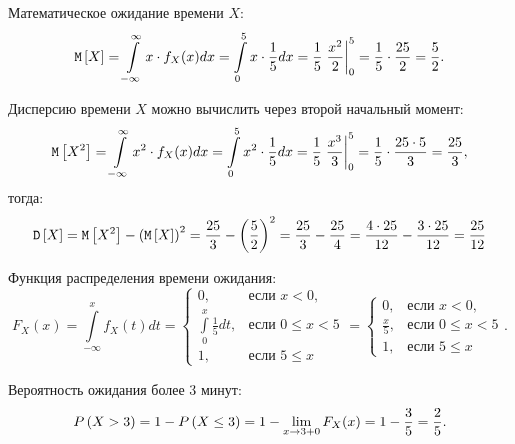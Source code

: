 Математическое ожидание времени $X$:
\begin{equation}
    \mathtt{M} \left [ X \right ]
    = \int \limits_{-\infty}^{\infty} x \cdot f_X(x) dx
    = \int \limits_0^5 x \cdot \frac{1}{5} dx
    = \frac{1}{5} \left . \frac{x^2}{2} \right |_0^5
    = \frac{1}{5} \cdot \frac{25}{2}
    = \frac{5}{2} .
\end{equation}

Дисперсию времени $X$ можно вычислить через второй начальный момент:
\begin{equation}
    \mathtt{M} \left [ X^2 \right ]
    = \int \limits_{-\infty}^{\infty} x^2 \cdot f_X(x) dx
    = \int \limits_0^5 x^2 \cdot \frac{1}{5} dx
    = \frac{1}{5} \left . \frac{x^3}{3} \right |_0^5
    = \frac{1}{5} \cdot \frac{25 \cdot 5}{3}
    = \frac{25}{3} ,
\end{equation}
тогда:
\begin{equation}
    \mathtt{D} \left [ X \right ]
    = \mathtt{M} \left [ X^2 \right ] - \left ( \mathtt{M} \left [ X \right ] \right )^2
    = \frac{25}{3} - \left ( \frac{5}{2} \right )^2
    = \frac{25}{3} - \frac{25}{4}
    = \frac{4 \cdot 25}{12} - \frac{3 \cdot 25}{12}
    = \frac{25}{12}
\end{equation}

Функция распределения времени ожидания:
\begin{equation}
    F_X(x)
    = \int \limits_{-\infty}^x f_X(t) dt
    = \left \{
    \begin{array}{ll}
        0,                                 & \text{если } x < 0,      \\
        \int \limits_{0}^x \frac{1}{5} dt, & \text{если } 0 \le x < 5 \\
        1,                                 & \text{если } 5 \le x
    \end{array}
    \right .
    = \left \{
    \begin{array}{ll}
        0,              & \text{если } x < 0,      \\
        \frac{x}{5}, & \text{если } 0 \le x < 5 \\
        1,              & \text{если } 5 \le x
    \end{array}
    \right .
    .
\end{equation}

Вероятность ожидания более 3 минут:
\begin{equation}
    P \left ( X > 3 \right )
    = 1 - P \left ( X \le 3 \right )
    = 1 - \lim \limits_{x \rightarrow 3 + 0} F_X(x)
    = 1 - \frac{3}{5}
    = \frac{2}{5}.
\end{equation}

